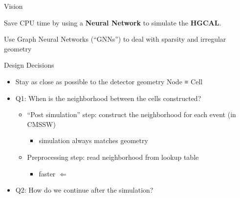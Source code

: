 \documentclass[lualatex,handout,aspectratio=1610]{beamer}
\begin{document}
\maketitle


\begin{frame}{Vision}
	\begin{center}
		\large Save CPU time by using a \textbf{Neural Network} to simulate the \textbf{HGCAL}.
	\end{center}
	\vfill
	\pause
	\begin{center}
		\small Use Graph Neural Networks (“GNNs”) to deal with sparsity and irregular geometry
	\end{center}

\end{frame}



\begin{frame}{Design Decisions}
	\begin{itemize}[<+->]
		\item Stay as close as possible to the detector geometry \imp Node ≡ Cell
		\item Q1: When is the neighborhood between the cells constructed?\\
		      \begin{itemize}
			      \item “Post simulation” step: construct the neighborhood for each event (in CMSSW)
			            \begin{itemize}
				            \item simulation always matches geometry
			            \end{itemize}
			            \pause\vs
			      \item Preprocessing step: read neighborhood from lookup table
			            \begin{itemize}
				            \item faster $⇐$
			            \end{itemize}
		      \end{itemize}
		\item Q2: How do we continue after the simulation?%
	\end{itemize}
\end{frame}
\end{document}
